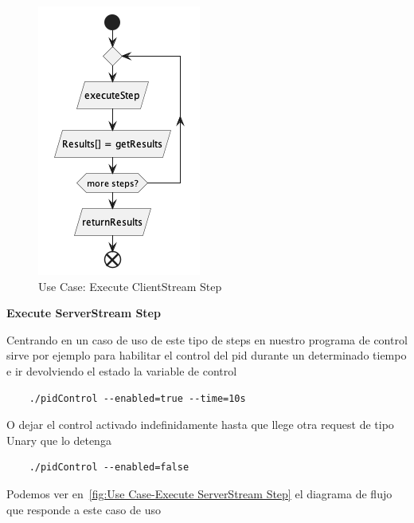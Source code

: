 \begin{figure}[H]
    \centering
    \includegraphics[height=0.2\textheight]{./part/Proyecto_ejecutivo/memoria_descriptiva/descripcionDelProyecto/client/uml/executeClientStreamStep}
    \caption{Use Case: Execute ClientStream Step}\label{fig:Use Case-Execute ClientStream Step}
\end{figure}

\textbf{Execute ServerStream Step}

Centrando en un caso de uso de este tipo de steps en nuestro programa de control sirve por ejemplo para habilitar el control del pid durante un determinado tiempo e ir devolviendo el estado la variable de control
\begin{verbatim}
    ./pidControl --enabled=true --time=10s
\end{verbatim}

O dejar el control activado indefinidamente hasta que llege otra request de tipo Unary que lo detenga

\begin{verbatim}
    ./pidControl --enabled=false
\end{verbatim}

Podemos ver en~\cref{fig:Use Case-Execute ServerStream Step} el diagrama de flujo que responde a este caso de uso

